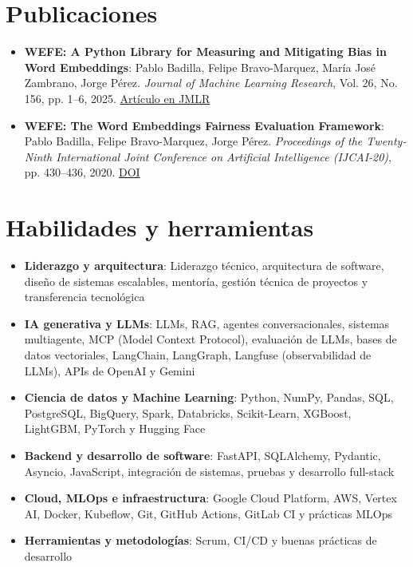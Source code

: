 \documentclass[letterpaper,11pt]{article}
\newcommand{\resumeItem}[2]{
  \item\small{
    \textbf{#1}{: #2\vspace{-2pt}}
  }
}
\newcommand{\resumeSubItem}[2]{\resumeItem{#1}{#2}\vspace{-4pt}}
\newcommand{\resumeSubHeadingListStart}{\begin{itemize}[leftmargin=*]}
\newcommand{\resumeSubHeadingListEnd}{\end{itemize}}
\begin{document}
\section{Publicaciones}
  \resumeSubHeadingListStart
    \resumeSubItem{WEFE: A Python Library for Measuring and Mitigating Bias in Word Embeddings}
      {Pablo Badilla, Felipe Bravo-Marquez, María José Zambrano, Jorge Pérez. \textit{Journal of Machine Learning Research}, Vol. 26, No. 156, pp. 1--6, 2025. \href{http://jmlr.org/papers/v26/22-1133.html}{Artículo en JMLR}}
    \resumeSubItem{WEFE: The Word Embeddings Fairness Evaluation Framework}
      {Pablo Badilla, Felipe Bravo-Marquez, Jorge Pérez. \textit{Proceedings of the Twenty-Ninth International Joint Conference on Artificial Intelligence (IJCAI-20)}, pp. 430--436, 2020. \href{https://doi.org/10.24963/ijcai.2020/60}{DOI}}
  \resumeSubHeadingListEnd

 \section{Habilidades y herramientas}
 \resumeSubHeadingListStart
    \resumeSubItem{Liderazgo y arquitectura}{Liderazgo técnico, arquitectura de software, diseño de sistemas escalables, mentoría, gestión técnica de proyectos y transferencia tecnológica}
    \resumeSubItem{IA generativa y LLMs}{LLMs, RAG, agentes conversacionales, sistemas multiagente, MCP (Model Context Protocol), evaluación de LLMs, bases de datos vectoriales, LangChain, LangGraph, Langfuse (observabilidad de LLMs), APIs de OpenAI y Gemini}
    \resumeSubItem{Ciencia de datos y Machine Learning}{Python, NumPy, Pandas, SQL, PostgreSQL, BigQuery, Spark, Databricks, Scikit-Learn, XGBoost, LightGBM, PyTorch y Hugging Face}
    \resumeSubItem{Backend y desarrollo de software}{FastAPI, SQLAlchemy, Pydantic, Asyncio, JavaScript, integración de sistemas, pruebas y desarrollo full-stack}
    \resumeSubItem{Cloud, MLOps e infraestructura}{Google Cloud Platform, AWS, Vertex AI, Docker, Kubeflow, Git, GitHub Actions, GitLab CI y prácticas MLOps}
    \resumeSubItem{Herramientas y metodologías}{Scrum, CI/CD y buenas prácticas de desarrollo}
 \resumeSubHeadingListEnd

\end{document}
